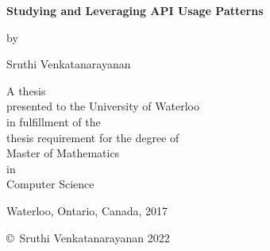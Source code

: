 \pagestyle{empty}

\begin{titlepage}
        \begin{center}
        \vspace*{1.0cm}

        \Huge
        {\bf Studying and Leveraging API Usage Patterns}

        \vspace*{1.0cm}

        \normalsize
        by \\

        \vspace*{1.0cm}

        \Large
        Sruthi Venkatanarayanan \\

        \vspace*{3.0cm}

        \normalsize
        A thesis \\
        presented to the University of Waterloo \\ 
        in fulfillment of the \\
        thesis requirement for the degree of \\
        Master of Mathematics \\
        in \\
        Computer Science \\

        \vspace*{2.0cm}

        Waterloo, Ontario, Canada, 2017 \\

        \vspace*{1.0cm}

        \copyright\ Sruthi Venkatanarayanan 2022 \\
        \end{center}
\end{titlepage}

\pagestyle{plain}
\setcounter{page}{2}

